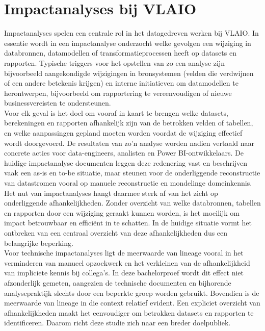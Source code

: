 \section{Impactanalyses bij VLAIO}

Impactanalyses spelen een centrale rol in het datagedreven werken bij VLAIO. In essentie wordt in een impactanalyse onderzocht welke gevolgen een wijziging in databronnen, datamodellen of transformatieprocessen heeft op datasets en rapporten. Typische triggers voor het opstellen van zo een analyse zijn bijvoorbeeld aangekondigde wijzigingen in bronsystemen (velden die verdwijnen of een andere betekenis krijgen) en interne initiatieven om data\-modellen te herontwerpen, bijvoorbeeld om rapportering te vereenvoudigen of nieuwe businessvereisten te ondersteunen.\\

Voor elk geval is het doel om vooraf in kaart te brengen welke datasets, berekeningen en rapporten afhankelijk zijn van de betrokken velden of tabellen, en welke aanpassingen gepland moeten worden voordat de wijziging effectief wordt doorgevoerd. De resultaten van zo'n analyse worden nadien vertaald naar concrete acties voor data-engineers, analisten en Power BI-ontwikkelaars. De huidige impact\-analyse documenten leggen deze redenering vast en beschrijven vaak een as-is en to-be situatie, maar steunen voor de onderliggende reconstructie van datastromen vooral op manuele reconstructie en mondelinge domeinkennis.\\

Het nut van impactanalyses hangt daarmee sterk af van het zicht op onderliggende afhankelijkheden. Zonder overzicht van welke databronnen, tabellen en rapporten door een wijziging geraakt kunnen worden, is het moeilijk om impact betrouwbaar en efficiënt in te schatten. In de huidige situatie vormt het ontbreken van een centraal overzicht van deze afhankelijkheden dus een belangrijke beperking.\\

Voor technische impactanalyses ligt de meerwaarde van lineage vooral in het verminderen van manueel opzoekwerk en het verkleinen van de afhankelijkheid van impliciete kennis bij collega's. In deze bachelorproef wordt dit effect niet afzonderlijk gemeten, aangezien de technische documenten en bijhorende analysepraktijk slechts door een beperkte groep worden gebruikt. Bovendien is de meerwaarde van lineage in die context relatief evident. Een expliciet overzicht van afhankelijkheden maakt het eenvoudiger om betrokken datasets en rapporten te identificeren. Daarom richt deze studie zich naar een breder doelpubliek.\\

